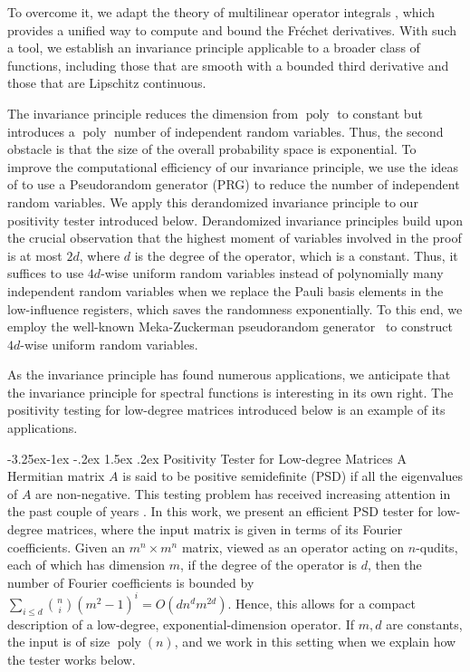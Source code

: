 \documentclass[11pt]{article}
\makeatletter
\renewcommand{\subsubsection}{\@startsection{subsubsection}{2}{\z@}%
             {-3.25ex\@plus -1ex \@minus -.2ex}%
             {1.5ex \@plus .2ex}%
             {\normalfont\normalsize\scshape\bfseries}}
\theoremstyle{plain}
\theoremstyle{definition}
\newcommand{\poly} {\ensuremath{\operatorname{poly}}}
\newcommand{\1}{\mathbb{1}} %
\makeatother
\begin{document}
To overcome it, we adapt the theory of multilinear operator integrals \cite{skripka2019multilinear}, which provides a unified way to compute and bound the Fr\'echet derivatives. With such a tool, we establish an invariance principle applicable to a broader class of functions, including those that are smooth with a bounded third derivative and those that are Lipschitz continuous.



The invariance principle reduces the dimension from $\poly$ to constant but introduces a $\poly$ number of independent random variables. Thus, the second obstacle is that the size of the overall probability space is exponential.  
To improve the computational efficiency of our invariance principle, we use the ideas of \cite{10.1145/1806689.1806749,10.1145/2395116.2395118,10.1145/3460532} to use a Pseudorandom generator (PRG) to reduce the number of independent random variables. We apply this derandomized invariance principle to our positivity tester introduced below.
Derandomized invariance principles build upon the crucial observation that the highest moment of variables involved in the proof is at most $2d$, where $d$ is the degree of the operator, which is a constant.
Thus, it suffices to use $4d$-wise uniform random variables instead of polynomially many independent random variables when we replace the Pauli basis elements in the low-influence registers, which saves the randomness exponentially. To this end, we employ the well-known Meka-Zuckerman pseudorandom generator~\cite{10.1145/1806689.1806749} to construct $4d$-wise uniform random variables.


As the invariance principle has found numerous applications, we anticipate that the invariance principle for spectral functions is interesting in its own right. The positivity testing for low-degree matrices introduced below is an example of its applications.



\subsubsection{Positivity Tester for Low-degree Matrices} A Hermitian matrix $A$ is said to be positive semidefinite (PSD) if all the eigenvalues of $A$ are non-negative. This testing problem has received increasing attention in the past couple of years \cite{10.5555/644108.644112,han2017approximating,bakshi2020testing,9996743}. In this work, we present an efficient PSD tester for low-degree matrices, where the input matrix is given in terms of its Fourier coefficients. Given an $m^n\times m^n$ matrix, viewed as an operator acting on $n$-qudits, each of which has dimension $m$, if the degree of the operator is $d$, then the number of Fourier coefficients is bounded by $\sum_{i\le d}\binom{n}{i}(m^2-1)^i=O(dn^dm^{2d})$. Hence, this allows for a compact description of a low-degree, exponential-dimension operator.
If $m, d$ are constants, the input is of size $\poly(n)$, and we work in this setting when we explain how the tester works below.
\end{document}
